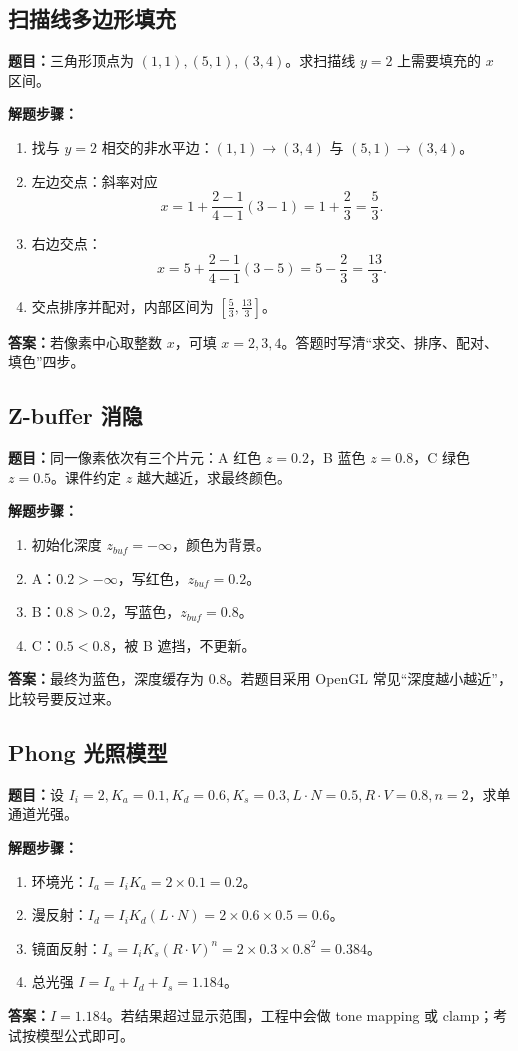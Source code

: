 \documentclass[UTF8,zihao=-4,scheme=chinese,fontset=fandol]{ctexart}
\begin{document}
\subsection{扫描线多边形填充}
\textbf{题目：}三角形顶点为 $(1,1),(5,1),(3,4)$。求扫描线 $y=2$ 上需要填充的 $x$ 区间。

\textbf{解题步骤：}
\begin{enumerate}
  \item 找与 $y=2$ 相交的非水平边：$(1,1)\to(3,4)$ 与 $(5,1)\to(3,4)$。
  \item 左边交点：斜率对应
  \[
  x=1+\frac{2-1}{4-1}(3-1)=1+\frac23=\frac53.
  \]
  \item 右边交点：
  \[
  x=5+\frac{2-1}{4-1}(3-5)=5-\frac23=\frac{13}{3}.
  \]
  \item 交点排序并配对，内部区间为 $\left[\frac53,\frac{13}{3}\right]$。
\end{enumerate}
\textbf{答案：}若像素中心取整数 $x$，可填 $x=2,3,4$。答题时写清“求交、排序、配对、填色”四步。

\subsection{Z-buffer 消隐}
\textbf{题目：}同一像素依次有三个片元：A 红色 $z=0.2$，B 蓝色 $z=0.8$，C 绿色 $z=0.5$。课件约定 $z$ 越大越近，求最终颜色。

\textbf{解题步骤：}
\begin{enumerate}
  \item 初始化深度 $z_{buf}=-\infty$，颜色为背景。
  \item A：$0.2>- \infty$，写红色，$z_{buf}=0.2$。
  \item B：$0.8>0.2$，写蓝色，$z_{buf}=0.8$。
  \item C：$0.5<0.8$，被 B 遮挡，不更新。
\end{enumerate}
\textbf{答案：}最终为蓝色，深度缓存为 $0.8$。若题目采用 OpenGL 常见“深度越小越近”，比较号要反过来。

\subsection{Phong 光照模型}
\textbf{题目：}设 $I_i=2,K_a=0.1,K_d=0.6,K_s=0.3,L\cdot N=0.5,R\cdot V=0.8,n=2$，求单通道光强。

\textbf{解题步骤：}
\begin{enumerate}
  \item 环境光：$I_a=I_iK_a=2\times0.1=0.2$。
  \item 漫反射：$I_d=I_iK_d(L\cdot N)=2\times0.6\times0.5=0.6$。
  \item 镜面反射：$I_s=I_iK_s(R\cdot V)^n=2\times0.3\times0.8^2=0.384$。
  \item 总光强 $I=I_a+I_d+I_s=1.184$。
\end{enumerate}
\textbf{答案：}$I=1.184$。若结果超过显示范围，工程中会做 tone mapping 或 clamp；考试按模型公式即可。
\end{document}
